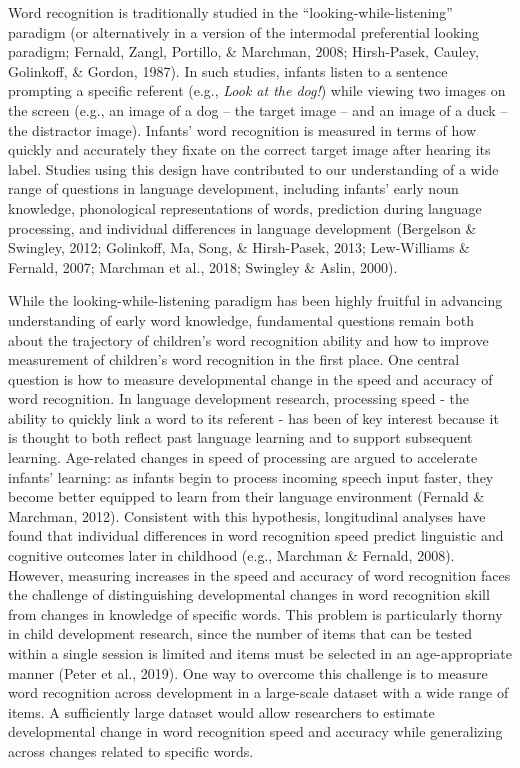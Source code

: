 \documentclass[10pt, letterpaper]{article}
\begin{document}
Word recognition is traditionally studied in the
``looking-while-listening'' paradigm (or alternatively in a version of
the intermodal preferential looking paradigm; Fernald, Zangl, Portillo,
\& Marchman, 2008; Hirsh-Pasek, Cauley, Golinkoff, \& Gordon, 1987). In
such studies, infants listen to a sentence prompting a specific referent
(e.g., \emph{Look at the dog!}) while viewing two images on the screen
(e.g., an image of a dog -- the target image -- and an image of a duck
-- the distractor image). Infants' word recognition is measured in terms
of how quickly and accurately they fixate on the correct target image
after hearing its label. Studies using this design have contributed to
our understanding of a wide range of questions in language development,
including infants' early noun knowledge, phonological representations of
words, prediction during language processing, and individual differences
in language development (Bergelson \& Swingley, 2012; Golinkoff, Ma,
Song, \& Hirsh-Pasek, 2013; Lew-Williams \& Fernald, 2007; Marchman et
al., 2018; Swingley \& Aslin, 2000).

While the looking-while-listening paradigm has been highly fruitful in
advancing understanding of early word knowledge, fundamental questions
remain both about the trajectory of children's word recognition ability
and how to improve measurement of children's word recognition in the
first place. One central question is how to measure developmental change
in the speed and accuracy of word recognition. In language development
research, processing speed - the ability to quickly link a word to its
referent - has been of key interest because it is thought to both
reflect past language learning and to support subsequent learning.
Age-related changes in speed of processing are argued to accelerate
infants' learning: as infants begin to process incoming speech input
faster, they become better equipped to learn from their language
environment (Fernald \& Marchman, 2012). Consistent with this
hypothesis, longitudinal analyses have found that individual differences
in word recognition speed predict linguistic and cognitive outcomes
later in childhood (e.g., Marchman \& Fernald, 2008). However, measuring
increases in the speed and accuracy of word recognition faces the
challenge of distinguishing developmental changes in word recognition
skill from changes in knowledge of specific words. This problem is
particularly thorny in child development research, since the number of
items that can be tested within a single session is limited and items
must be selected in an age-appropriate manner (Peter et al., 2019). One
way to overcome this challenge is to measure word recognition across
development in a large-scale dataset with a wide range of items. A
sufficiently large dataset would allow researchers to estimate
developmental change in word recognition speed and accuracy while
generalizing across changes related to specific words.
\end{document}
